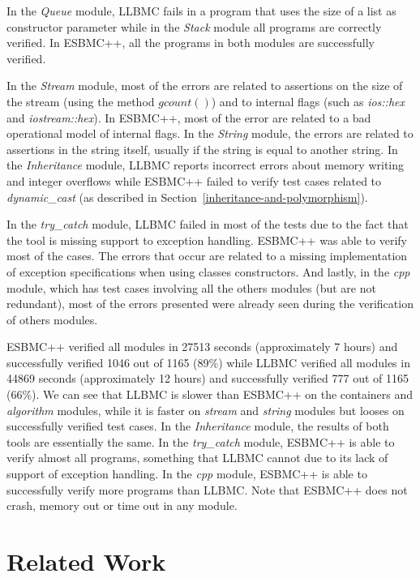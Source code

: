 \documentclass[a4paper]{llncs}
\begin{document}
In the \textit{Queue} module, LLBMC fails in a program that uses the size of a list
as constructor parameter while in the \textit{Stack} module all programs are correctly verified.
In ESBMC++, all the programs in both modules are successfully verified.

In the \textit{Stream} module, most of the errors are related to assertions on the size
of the stream (using the method $gcount\left(\right)$) and to internal flags (such as
\textit{ios::hex} and \textit{iostream::hex}). In ESBMC++, most of the error are related
to a bad operational model of internal flags. In the \textit{String} module, the errors are related
to assertions in the string itself, usually if the string is equal to another string.
In the \textit{Inheritance} module, LLBMC reports incorrect errors about memory writing and
integer overflows while ESBMC++ failed to verify test cases related to
\textit{dynamic\_cast} (as described in Section~\ref{inheritance-and-polymorphism}).

In the \textit{try\_catch} module, LLBMC failed in most of the tests due to the fact that
the tool is missing support to exception handling. ESBMC++ was able to verify most of the cases.
The errors that occur are related to a missing implementation of exception specifications when
using classes constructors. And lastly, in the \textit{cpp} module, which has test cases involving all
the others modules (but are not redundant), most of the errors presented were already seen during
the verification of others modules.

ESBMC++ verified all modules in 27513 seconds (approximately 7 hours)
and successfully verified 1046 out of 1165 (89\%) while LLBMC verified all modules
in 44869 seconds (approximately 12 hours) and successfully verified 777 out of 1165
(66\%). We can see that LLBMC is slower than ESBMC++ on the containers
and \textit{algorithm} modules, while it is faster on \textit{stream} and
\textit{string} modules but looses on successfully verified test cases.
In the \textit{Inheritance} module, the results of both tools are essentially the same.
In the \textit{try\_catch} module, ESBMC++ is able to verify almost all programs,
something that LLBMC cannot due to its lack of support of exception handling.
In the \textit{cpp} module, ESBMC++ is able to successfully verify more programs than LLBMC.
Note that ESBMC++ does not crash, memory out or time out in any module.

\section{Related Work}
\end{document}
